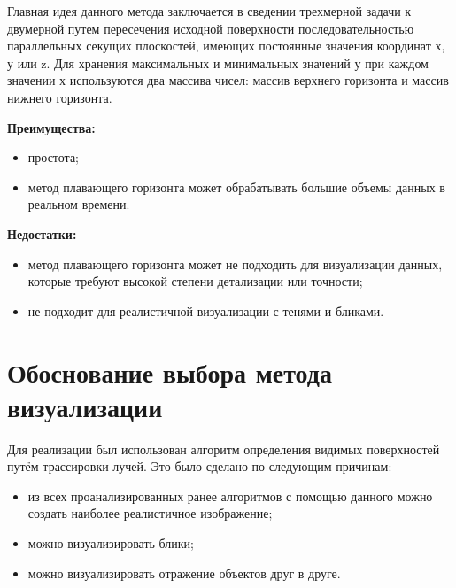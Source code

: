 Главная идея данного метода заключается в сведении трехмерной задачи к двумерной путем пересечения исходной поверхности последовательностью параллельных секущих плоскостей, имеющих постоянные значения координат х, у или z. Для хранения максимальных и минимальных значений у при каждом значении х используются два массива чисел: массив верхнего горизонта и массив нижнего горизонта.

\textbf{Преимущества:}
\begin{itemize}
	\item простота;
	\item метод плавающего горизонта может обрабатывать большие объемы данных в реальном времени.
\end{itemize}

\textbf{Недостатки:}
\begin{itemize}
	\item метод плавающего горизонта может не подходить для визуализации данных, которые требуют высокой степени детализации или точности;
	\item не подходит для реалистичной визуализации с тенями и бликами.
\end{itemize}

\section{Обоснование выбора метода визуализации}
Для реализации был использован алгоритм определения видимых поверхностей путём трассировки лучей. Это было сделано по следующим причинам:
\begin{itemize}
	\item из всех проанализированных ранее алгоритмов с помощью данного можно создать наиболее реалистичное изображение;
	\item можно визуализировать блики;
	\item можно визуализировать отражение объектов друг в друге.
\end{itemize}
\clearpage
